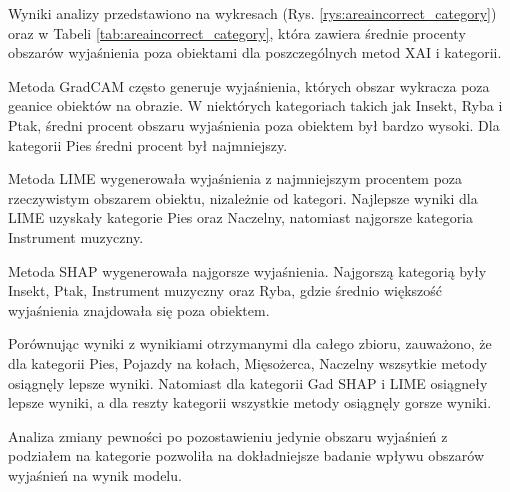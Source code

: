 Wyniki analizy  przedstawiono na wykresach (Rys. \ref{rys:areaincorrect_category}) oraz w Tabeli \ref{tab:areaincorrect_category}, która zawiera średnie procenty obszarów wyjaśnienia poza obiektami dla poszczególnych metod XAI i kategorii.

Metoda GradCAM często generuje wyjaśnienia, których obszar wykracza poza geanice obiektów na obrazie.
W niektórych kategoriach takich jak Insekt, Ryba i Ptak, średni procent obszaru wyjaśnienia poza obiektem był bardzo wysoki.
Dla kategorii Pies średni procent był najmniejszy.

Metoda LIME wygenerowała wyjaśnienia z najmniejszym procentem poza rzeczywistym obszarem obiektu, nizależnie od kategori.
Najlepsze wyniki dla LIME uzyskały kategorie Pies oraz Naczelny, natomiast najgorsze kategoria Instrument muzyczny.

Metoda SHAP wygenerowała najgorsze wyjaśnienia.
Najgorszą kategorią były Insekt, Ptak, Instrument muzyczny oraz Ryba, gdzie średnio większość wyjaśnienia znajdowała się poza obiektem.

Porównując wyniki z wynikiami otrzymanymi dla całego zbioru, zauważono, że dla kategorii Pies, Pojazdy na kołach, Mięsożerca, Naczelny wszsytkie metody osiągnęly lepsze wyniki.
Natomiast dla kategorii Gad SHAP i LIME osiągneły lepsze wyniki, a dla reszty kategorii wszystkie metody osiągnęly gorsze wyniki.

\vspace{1cm}

Analiza zmiany pewności po pozostawieniu jedynie obszaru wyjaśnień z podziałem na kategorie pozwoliła na dokładniejsze badanie wpływu obszarów wyjaśnień na wynik modelu.

